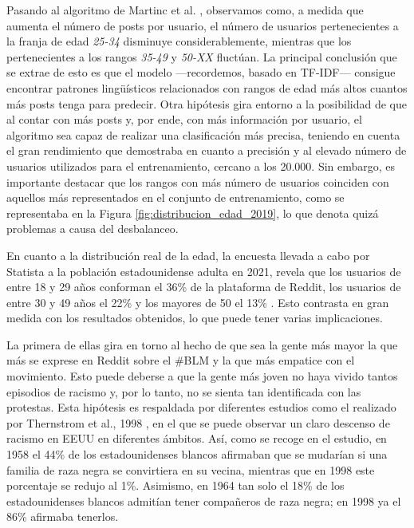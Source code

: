 \bigskip
Pasando al algoritmo de Martinc et al. \cite{martinc2019hot}, observamos
como, a medida que aumenta el número de posts por usuario, el número de usuarios pertenecientes a la franja de edad \textit{25-34} disminuye
considerablemente, mientras que los pertenecientes a los rangos \textit{35-49} y \textit{50-XX} fluctúan.
La principal conclusión que se extrae de esto es que el modelo —recordemos, basado en TF-IDF— consigue encontrar patrones lingüísticos
relacionados con rangos de edad más altos cuantos más posts tenga para predecir.
Otra hipótesis gira entorno a la posibilidad de que al contar con más posts y, por ende, con más información por usuario,
el algoritmo sea capaz de realizar una clasificación más precisa, teniendo en cuenta el gran rendimiento que demostraba en cuanto
a precisión y al elevado número de usuarios utilizados para el entrenamiento, cercano a los 20.000.
Sin embargo, es importante destacar que los rangos con más número de usuarios coinciden con aquellos
más representados en el conjunto de entrenamiento, como se representaba en la Figura \ref{fig:distribucion_edad_2019}, lo que denota quizá problemas
a causa del desbalanceo.

\bigskip
En cuanto a la distribución real de la edad, la encuesta llevada a cabo por Statista a la población estadounidense adulta en 2021,
revela que los usuarios de entre 18 y 29 años conforman el 36\% de la plataforma de Reddit, los usuarios de entre 30 y 49 años el 22\% y los mayores de 50 el 13\% \cite{statistaedad}.
Esto contrasta en gran medida con los resultados obtenidos, lo que puede tener varias implicaciones.

\bigskip
La primera de ellas gira en torno
al hecho de que sea la gente más mayor la que más se exprese en Reddit sobre el \#BLM y la que más empatice con el movimiento. Esto
puede deberse a que la gente más joven no haya vivido tantos episodios de racismo y, por lo tanto, no se sienta tan identificada con las protestas.
Esta hipótesis es respaldada por diferentes estudios como el realizado por Thernstrom et al., 1998 \cite{thernstrom1998black}, en el que se puede observar un claro descenso de
racismo en EEUU en diferentes ámbitos. Así, como se recoge en el estudio, en 1958 el 44\% de los estadounidenses blancos afirmaban que se mudarían si
una familia de raza negra se convirtiera en su vecina, mientras que en 1998 este porcentaje se redujo al 1\%. Asimismo, en 1964 tan solo el 18\% de los estadounidenses blancos
admitían tener compañeros de raza negra; en 1998 ya el 86\% afirmaba tenerlos.

